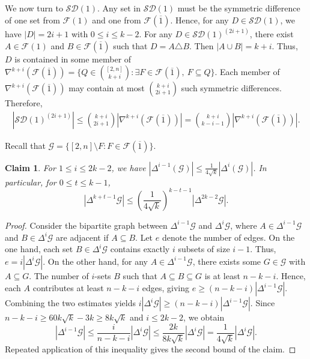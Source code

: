 \documentclass[11pt]{article}
\numberwithin{equation}{section}
\newtheorem{claim}{Claim}[section]
\begin{document}
    
We now turn to $\mathcal{SD}(1)$. Any set in $\mathcal{SD}(1)$ must be the symmetric difference of one set from $\mathcal{F}(1)$ and one from $\mathcal{F}(\overline{1})$.
Hence, for any $D\in \mathcal{SD}(1)$,  we have $|D|=2i+1$ with $0\le i\le k-2$. 
For any $D \in \mathcal{SD}(1)^{(2i+1)}$, there exist $A \in \mathcal{F}(1)$ and $B \in \mathcal{F}(\overline{1})$ such that $D = A \triangle B$. Then  $|A\cup B|=k+i$. Thus, $D$ is contained in some member of $\nabla^{k+i}(\mathcal{F}(\overline{1}))=\{Q\in\binom{[2,n]}{k+i} :\exists F \in \mathcal{F}(\overline{1}), \ F\subseteq Q\}$.  Each member of $\nabla^{k+i}(\mathcal{F}(\overline{1}))$ may contain at most $\binom{k+i}{2i+1}$ such symmetric differences. 
Therefore, 
 \begin{align}
 |\mathcal{SD}(1)^{(2i+1)}|\le \binom{k+i}{2i+1}|\nabla^{k+i}(\mathcal{F}(\overline{1}))|=\binom{k+i}{k-i-1}|\nabla^{k+i}(\mathcal{F}(\overline{1}))|.\label{fo6}
 \end{align}
 
Recall that  $\mathcal{G} = \{[2,n] \setminus F : F \in \mathcal{F}(\overline{1})\}$.

\begin{claim}\label{cl6}
For $1\le i\le2k-2$,	we have $|\Delta^{i-1}(\mathcal{G})|\le \frac{1}{4\sqrt{k}}|\Delta^{i}(\mathcal{G})|$. In particular,  for $0\le t\le k-1$,  $$|\Delta^{k+t-1} \mathcal{G}| \leq \left(\frac{1}{4\sqrt{k}}\right)^{k-t-1} |\Delta^{2k-2} \mathcal{G}|.$$
\end{claim}

\begin{proof}
Consider the bipartite graph between $\Delta^{i-1}\mathcal{G}$ and $\Delta^{i}\mathcal{G}$, where  $A\in \Delta^{i-1}\mathcal{G}$ and $B\in \Delta^{i}\mathcal{G}$ are adjacent if $A \subseteq B$. Let $e$ denote the number of edges.
On the one hand, each set $B \in \Delta^{i}\mathcal{G}$ contains exactly $i$ subsets of size $i-1$. Thus, $e = i |\Delta^{i}\mathcal{G}|$.
On the other hand, for any $A \in \Delta^{i-1}\mathcal{G}$, there exists some $G \in \mathcal{G}$ with $A \subseteq G$. The number of $i$-sets $B$ such that $A \subseteq B \subseteq G$ is at least $n-k-i$. Hence, each $A$ contributes at least $n-k-i$ edges, giving $e \ge (n-k-i) |\Delta^{i-1}\mathcal{G}|$.
Combining the two estimates yields
$
i |\Delta^{i}\mathcal{G}| \ge (n-k-i) |\Delta^{i-1}\mathcal{G}|.
$
Since $n-k-i \ge 60k\sqrt{k} - 3k \ge 8k\sqrt{k}$ and $i \le 2k-2$, we obtain
$$
|\Delta^{i-1}\mathcal{G}| \le \frac{i}{n-k-i} |\Delta^{i}\mathcal{G}| \le \frac{2k}{8k\sqrt{k}} |\Delta^{i}\mathcal{G}| = \frac{1}{4\sqrt{k}} |\Delta^{i}\mathcal{G}|.
$$
Repeated application of this inequality gives the second bound of the claim.		
\end{proof}
\end{document}
